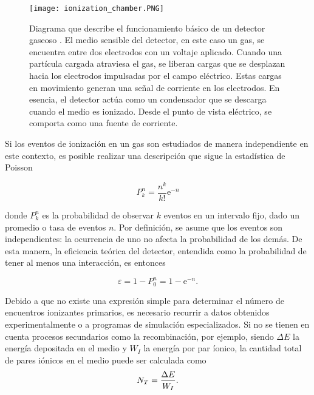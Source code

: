 \documentclass{report}
\begin{document}
\begin{figure}[H]
    \centering
    \texttt{[image: ionization\_chamber.PNG]}
    \caption{Diagrama que describe el funcionamiento básico de un detector gaseoso \cite{kolanoski2020particle2}. El medio sensible del detector, en este caso un gas, se encuentra entre dos electrodos con un voltaje aplicado. Cuando una partícula cargada atraviesa el gas, se liberan cargas que se desplazan hacia los electrodos impulsadas por el campo eléctrico. Estas cargas en movimiento generan una señal de corriente en los electrodos. En esencia, el detector actúa como un condensador que se descarga cuando el medio es ionizado. Desde el punto de vista eléctrico, se comporta como una fuente de corriente.}
    \label{fig:ionization_chamber1}
\end{figure}

\noindent Si los eventos de ionización en un gas son estudiados de manera independiente en este contexto, es posible realizar una descripción que sigue la estadística de Poisson

\begin{equation}
    \label{eq:poisson}
    P_k^n=\frac{n^k}{k!} \mathrm{e}^{-n}
\end{equation}

\noindent donde $ P_k^n$ es la probabilidad de observar $k$ eventos en un intervalo fijo, dado un promedio o tasa de eventos $n$. Por definición, se asume que los eventos son independientes: la ocurrencia de uno no afecta la probabilidad de los demás. De esta manera, la eficiencia teórica del detector, entendida como la probabilidad de tener al menos una interacción, es entonces

\begin{equation}
    \label{eq:det_eff}
    \varepsilon=1-P_0^n=1-\mathrm{e}^{-n} .
\end{equation}

\noindent Debido a que no existe una expresión simple para determinar el número de encuentros ionizantes primarios, es necesario recurrir a datos obtenidos experimentalmente o a programas de simulación especializados. Si no se tienen en cuenta procesos secundarios como la recombinación, por ejemplo, siendo $\Delta E$ la energía depositada en el medio y $W_{I}$ la energía por par íonico, la cantidad total de pares iónicos en el medio puede ser calculada como 
\begin{equation}
    \label{eq:num_ion}
    N_{T} = \frac{\Delta E}{W_{I}}. \\
\end{equation}
\end{document}
